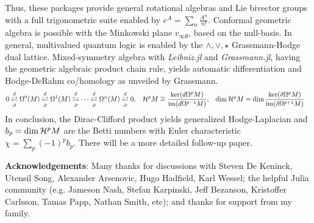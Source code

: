 \documentclass[]{article}
\begin{document}
Thus, these packages provide general rotational algebras and Lie bivector groups with a full trigonometric suite enabled by $ e^{A} = \sum_n \frac{A^n}{n!} $.
Conformal geometric algebra is possible with the Minkowski plane $v_{\infty\emptyset}$, based on the null-basis.
In general, multivalued quantum logic is enabled by the $\wedge,\vee,\star$ Grassmann-Hodge dual lattice.
Mixed-symmetry algebra with \textit{Leibniz.jl} and \textit{Grassmann.jl}, having the geometric algebraic product chain rule, yields automatic differentiation and Hodge-DeRahm co/homology  as unveiled by Grassmann.
\begin{align*}
	0 &\overset{d}{\underset{\partial}{\rightleftarrows}} \Omega^0(M) \overset{d}{\underset{\partial}{\rightleftarrows}} \Omega^1(M) \overset{d}{\underset{\partial}{\leftrightarrows}} \cdots \overset{d}{\underset{\partial}{\rightleftarrows}} \Omega^n(M) \overset{d}{\underset{\partial}{\rightleftarrows}} 0, & \mathcal{H}^pM &\cong \frac{\ker(d\Omega^pM)}{\text{im}(d\Omega^{p-1}M)}, & \dim\mathcal{H}^pM &= \dim\frac{\ker(\delta\Omega^pM)}{\text{im}(\delta\Omega^{p+1}M)}
\end{align*}
In conclusion, the Dirac-Clifford product yields generalized Hodge-Laplacian and $b_p=\dim\mathcal{H}^pM$ are the Betti numbers with Euler characteristic $\chi = \sum_p (-1)^pb_p$.
There will be a more detailed follow-up paper.

\textbf{Acknowledgements}: Many thanks for discussions with Steven De Keninck, Utensil Song, Alexander Arsenovic, Hugo Hadfield, Karl Wessel; the helpful Julia community (e.g. Jameson Nash, Stefan Karpinski, Jeff Bezanson, Kristoffer Carlsson, Tamas Papp, Nathan Smith, etc); and thanks for support from my family.




\end{document}
